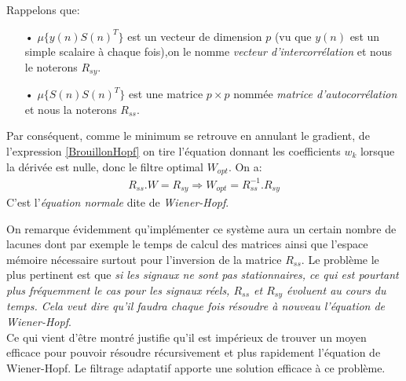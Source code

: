 Rappelons que:
\begin{itemize}
\item[•] $ \mu \{y(n)S(n)^{T}\} $ est un vecteur de dimension $ p $ (vu que $ y(n) $ est un simple scalaire à chaque fois),on le nomme \emph{vecteur d'intercorrélation} et nous le noterons $ R_{sy} $.
\item[•] $ \mu \{S(n)S(n)^{T}\} $ est une matrice $ p\times p $ nommée \emph{matrice d'autocorrélation} et nous la noterons $ R_{ss} $.
\end{itemize}
Par conséquent, comme le minimum se retrouve en annulant le gradient, de l'expression \ref{BrouillonHopf} on tire l'équation donnant les coefficients $ w_{k} $ lorsque la dérivée est nulle, donc le filtre optimal $ W_{opt} $. On a:
\begin{eqnarray}\label{EquationWienerHopf}
R_{ss}.W = R_{sy} \Rightarrow W_{opt} = R_{ss}^{-1}.R_{sy}
\end{eqnarray}
C'est l'\emph{équation normale} dite de \emph{Wiener-Hopf}.

On remarque évidemment qu'implémenter ce système aura un certain nombre de lacunes dont par exemple le temps de calcul des matrices ainsi que l'espace mémoire nécessaire surtout pour l'inversion de la matrice $ R_{ss} $. Le problème le plus pertinent est que \emph{si les signaux ne sont pas stationnaires, ce qui est pourtant plus fréquemment le cas pour les signaux réels, $ R_{ss} $ et $ R_{sy} $ évoluent au cours du temps. Cela veut dire qu'il faudra chaque fois résoudre à nouveau l'équation de Wiener-Hopf}.\\
Ce qui vient d'être montré justifie qu'il est impérieux de trouver un moyen efficace pour pouvoir résoudre récursivement et plus rapidement l'équation de Wiener-Hopf. Le filtrage adaptatif apporte une solution efficace à ce problème.
